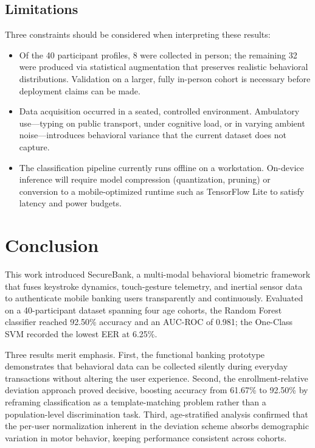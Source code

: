 \documentclass[conference]{IEEEtran}
\begin{document}
\subsection{Limitations}
Three constraints should be considered when interpreting these results:
\begin{itemize}
    \item Of the 40 participant profiles, 8 were collected in person; the remaining 32 were produced via statistical augmentation that preserves realistic behavioral distributions. Validation on a larger, fully in-person cohort is necessary before deployment claims can be made.
    \item Data acquisition occurred in a seated, controlled environment. Ambulatory use---typing on public transport, under cognitive load, or in varying ambient noise---introduces behavioral variance that the current dataset does not capture.
    \item The classification pipeline currently runs offline on a workstation. On-device inference will require model compression (quantization, pruning) or conversion to a mobile-optimized runtime such as TensorFlow Lite to satisfy latency and power budgets.
\end{itemize}

\section{Conclusion}

This work introduced SecureBank, a multi-modal behavioral biometric framework that fuses keystroke dynamics, touch-gesture telemetry, and inertial sensor data to authenticate mobile banking users transparently and continuously. Evaluated on a 40-participant dataset spanning four age cohorts, the Random Forest classifier reached 92.50\% accuracy and an AUC-ROC of 0.981; the One-Class SVM recorded the lowest EER at 6.25\%.

Three results merit emphasis. First, the functional banking prototype demonstrates that behavioral data can be collected silently during everyday transactions without altering the user experience. Second, the enrollment-relative deviation approach proved decisive, boosting accuracy from 61.67\% to 92.50\% by reframing classification as a template-matching problem rather than a population-level discrimination task. Third, age-stratified analysis confirmed that the per-user normalization inherent in the deviation scheme absorbs demographic variation in motor behavior, keeping performance consistent across cohorts.
\end{document}
